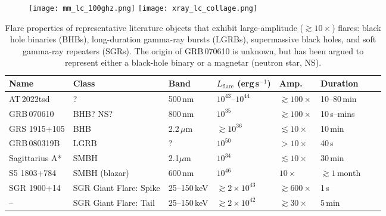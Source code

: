 \documentclass{nature_plusfigure}
\newcommand{\at}{AT2022tsd}
\begin{document}
\begin{figure*}
\centering
    \begin{subfigure}[t]{1.0\textwidth}
         \centering
         \texttt{[image: mm\_lc\_100ghz.png]}
        \texttt{[image: xray\_lc\_collage.png]}
     \end{subfigure}
\caption{\textbf{Millimeter (left) and X-ray (right) light curves of \at} and other radio-loud luminous fast blue optical transients (LFBOTs) compared to different classes of extragalactic transients: tidal disruption events (TDEs), long-duration gamma-ray bursts (LGRBs), low-luminosity GRBs (LLGRBs), and core-collapse supernovae (CC SNe). The millimeter and X-ray luminosity of LFBOTs resembles relativistic explosions such as LGRBs, and \at\ has the most luminous X-ray emission of any LFBOT to date. The millimeter points for AT2022tsd, and the X-ray points for AT2022tsd and FBOT AT2020xnd, are outlined in black for clarity.}
 \label{fig:mm-xray-lc}
\end{figure*}


\begin{table}
    \centering
    \begin{tabular}{l|l|l|l|l|l|l|l}
    \hline\hline
     Name & Class & Band & $L_\mathrm{flare}$ (erg\,s$^{-1}$) & Amp. & Duration \\
     \hline
    AT\,2022tsd & ? & 500\,nm & $10^{43}$--$10^{44}$ & $\gtrsim100\times$ & 10--80\,min \\
    GRB\,070610 & BHB?\cite{Kasliwal2008} NS?\cite{CastroTirado2008,Stefanescu2008} & 800\,nm & $10^{35}$ & $\gtrsim100\times$ & 10\,s--mins \\
    GRS 1915+105 & BHB & 2.2\,$\mu$m\cite{Fender1997} & $\gtrsim10^{36}$ & $\lesssim 10\times$ & 10\,min \\
    GRB\,080319B & LGRB & ?\cite{Racusin2008} & $10^{50}$ & $>10\times$ & 40\,s \\
    Sagittarius A* & SMBH & 2.1$\mu$m\cite{Marrone2008} & $10^{34}$ & $\lesssim 10\times$ & 30\,min \\
    S5 1803+784 & SMBH (blazar) & 600\,nm\cite{Nesci2021} & $10^{46}$ & $10\times$ & $\gtrsim1\,$month \\
    SGR 1900+14\cite{Hurley1999} & SGR Giant Flare: Spike & 25--150\,keV & $\gtrsim2\times10^{43}$ & $\gtrsim600\times$ & 1\,s \\
    -- & SGR Giant Flare: Tail & 25--150\,keV & $\gtrsim2\times10^{42}$ & $\gtrsim30\times$ & 5\,min \\
    \hline\hline
    \end{tabular}
    \caption{Flare properties of representative literature objects that exhibit large-amplitude ($\gtrsim10\times$) flares: black hole binaries (BHBs), long-duration gamma-ray bursts (LGRBs), supermassive black holes, and soft gamma-ray repeaters (SGRs). The origin of GRB\,070610 is unknown, but has been argued to represent either a black-hole binary or a magnetar (neutron star, NS).}
    \label{tab:flaring-classes}
\end{table}
\end{document}
